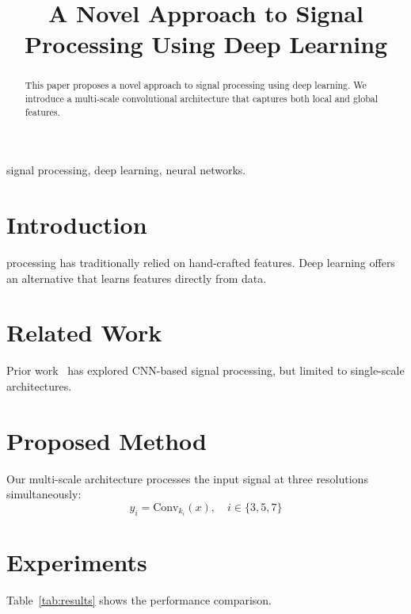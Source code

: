 \documentclass[conference]{IEEEtran}
\begin{document}
\title{A Novel Approach to Signal Processing
       Using Deep Learning}

\author{
\and
{}
}

\maketitle

\begin{abstract}
This paper proposes a novel approach to signal processing
using deep learning. We introduce a multi-scale convolutional
architecture that captures both local and global features.
\end{abstract}

\begin{IEEEkeywords}
signal processing, deep learning, neural networks.
\end{IEEEkeywords}

\section{Introduction}
 processing has traditionally relied
on hand-crafted features. Deep learning offers an alternative
that learns features directly from data.

\section{Related Work}
Prior work~\cite{ref1,ref2} has explored CNN-based signal
processing, but limited to single-scale architectures.

\section{Proposed Method}
Our multi-scale architecture processes the input signal
at three resolutions simultaneously:
\begin{equation}
y_i = \text{Conv}_{k_i}(x), \quad i \in \{3, 5, 7\}
\end{equation}

\section{Experiments}
Table~\ref{tab:results} shows the performance comparison.
\end{document}

